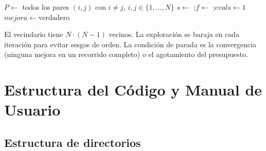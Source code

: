 \documentclass[12pt,a4paper]{article}
\begin{document}
\begin{algorithm}[H]
\caption{Búsqueda Local (primero mejor)}
$P \leftarrow$ todos los pares $(i,j)$ con $i \neq j$, $i,j \in \{1,\ldots,N\}$\;
$s \leftarrow$ \createSolution{};\quad $f \leftarrow$ ;\quad $evals \leftarrow 1$\;
$mejora \leftarrow \text{verdadero}$\;
\end{algorithm}

\noindent El vecindario tiene $N \cdot (N{-}1)$ vecinos. La exploración se baraja en
cada iteración para evitar sesgos de orden. La condición de parada es la convergencia
(ninguna mejora en un recorrido completo) o el agotamiento del presupuesto.


\section{Estructura del Código y Manual de Usuario}

\subsection{Estructura de directorios}
\end{document}
